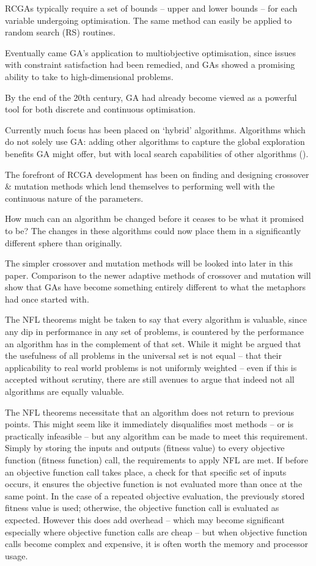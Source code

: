 \documentclass[
  a4paper,
]{article}
\newcommand{\+}{\phantom{-}}
\begin{document}
RCGAs typically require a set of bounds -- upper and lower bounds -- for
each variable undergoing optimisation. The same method can easily be
applied to random search (RS) routines.

Eventually came GA's application to multiobjective optimisation, since
issues with constraint satisfaction had been remedied, and GAs showed a
promising ability to take to high-dimensional problems.

By the end of the 20th century, GA had already become viewed as a
powerful tool for both discrete and continuous optimisation.

Currently much focus has been placed on `hybrid' algorithms. Algorithms
which do not solely use GA: adding other algorithms to capture the
global exploration benefits GA might offer, but with local search
capabilities of other algorithms ().

The forefront of RCGA development has been on finding and designing
crossover \& mutation methods which lend themselves to performing well
with the continuous nature of the parameters.

How much can an algorithm be changed before it ceases to be what it
promised to be? The changes in these algorithms could now place them in
a significantly different sphere than originally.

The simpler crossover and mutation methods will be looked into later in
this paper. Comparison to the newer adaptive methods of crossover and
mutation will show that GAs have become something entirely different to
what the metaphors had once started with.

The NFL theorems might be taken to say that every algorithm is valuable,
since any dip in performance in any set of problems, is countered by the
performance an algorithm has in the complement of that set. While it
might be argued that the usefulness of all problems in the universal set
is not equal -- that their applicability to real world problems is not
uniformly weighted -- even if this is accepted without scrutiny, there
are still avenues to argue that indeed not all algorithms are equally
valuable.

The NFL theorems necessitate that an algorithm does not return to
previous points. This might seem like it immediately disqualifies most
methods -- or is practically infeasible -- but any algorithm can be made
to meet this requirement. Simply by storing the inputs and outputs
(fitness value) to every objective function (fitness function) call, the
requirements to apply NFL are met. If before an objective function call
takes place, a check for that specific set of inputs occurs, it ensures
the objective function is not evaluated more than once at the same
point. In the case of a repeated objective evaluation, the previously
stored fitness value is used; otherwise, the objective function call is
evaluated as expected. However this does add overhead -- which may
become significant especially where objective function calls are cheap
-- but when objective function calls become complex and expensive, it is
often worth the memory and processor usage.
\end{document}
